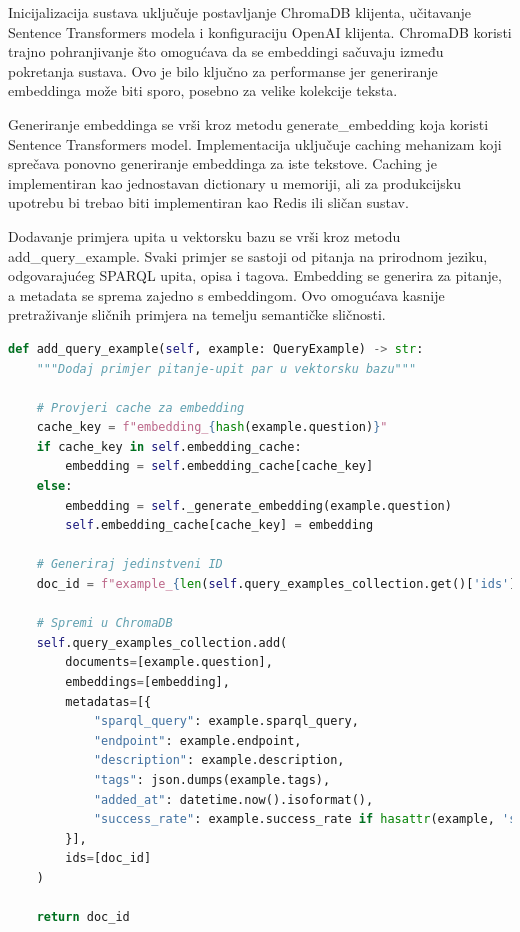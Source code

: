 Inicijalizacija sustava uključuje postavljanje ChromaDB klijenta, učitavanje Sentence Transformers modela i konfiguraciju OpenAI klijenta. ChromaDB koristi trajno pohranjivanje što omogućava da se embeddingi sačuvaju između pokretanja sustava. Ovo je bilo ključno za performanse jer generiranje embeddinga može biti sporo, posebno za velike kolekcije teksta.

Generiranje embeddinga se vrši kroz metodu generate\_embedding koja koristi Sentence Transformers model. Implementacija uključuje caching mehanizam koji sprečava ponovno generiranje embeddinga za iste tekstove. Caching je implementiran kao jednostavan dictionary u memoriji, ali za produkcijsku upotrebu bi trebao biti implementiran kao Redis ili sličan sustav.

Dodavanje primjera upita u vektorsku bazu se vrši kroz metodu add\_query\_example. Svaki primjer se sastoji od pitanja na prirodnom jeziku, odgovarajućeg SPARQL upita, opisa i tagova. Embedding se generira za pitanje, a metadata se sprema zajedno s embeddingom. Ovo omogućava kasnije pretraživanje sličnih primjera na temelju semantičke sličnosti.

\begin{lstlisting}[language=Python, caption=Implementacija dodavanja primjera u vektorsku bazu]
def add_query_example(self, example: QueryExample) -> str:
    """Dodaj primjer pitanje-upit par u vektorsku bazu"""
    
    # Provjeri cache za embedding
    cache_key = f"embedding_{hash(example.question)}"
    if cache_key in self.embedding_cache:
        embedding = self.embedding_cache[cache_key]
    else:
        embedding = self._generate_embedding(example.question)
        self.embedding_cache[cache_key] = embedding
    
    # Generiraj jedinstveni ID
    doc_id = f"example_{len(self.query_examples_collection.get()['ids'])}"
    
    # Spremi u ChromaDB
    self.query_examples_collection.add(
        documents=[example.question],
        embeddings=[embedding],
        metadatas=[{
            "sparql_query": example.sparql_query,
            "endpoint": example.endpoint,
            "description": example.description,
            "tags": json.dumps(example.tags),
            "added_at": datetime.now().isoformat(),
            "success_rate": example.success_rate if hasattr(example, 'success_rate') else None
        }],
        ids=[doc_id]
    )
    
    return doc_id
\end{lstlisting}

